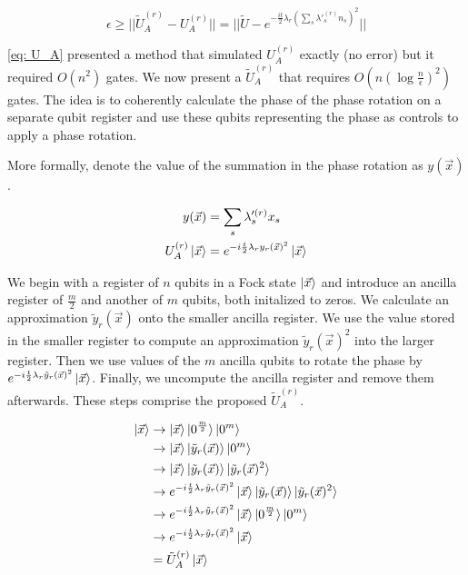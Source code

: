 \begin{equation}
    \epsilon \geq ||\tilde{U}_A^{(r)} - U_A^{(r)}|| = ||\tilde{U} - e^{-\frac{it}{2}\lambda_r\left(\sum_s \lambda'^{(r)}_s n_s\right)^2}|| \label{eq: error}
\end{equation}

\eqref{eq: U_A} presented a method that simulated $U_A^{(r)}$ exactly (no error) but it required $O(n^2)$ gates. We now present a $\tilde{U}_A^{(r)}$ that requires $O(n(\log{\frac{n}{\epsilon}})^2)$ gates. The idea is to coherently calculate the phase of the phase rotation on a separate qubit register and use these qubits representing the phase as controls to apply a phase rotation.

More formally, denote the value of the summation in the phase rotation as $y(\vec{x})$.

\begin{equation}
    \begin{split}
        y(\vec{x}) &= \sum_s \lambda'^{(r)}_s x_s \\
        U_A^{(r)}\ket{\vec{x}} &= e^{-i\frac{t}{2}\lambda_ry_r(\vec{x})^2}\ket{\vec{x}}
    \end{split}
\end{equation}

We begin with a register of $n$ qubits in a Fock state $\ket{\vec{x}}$ and introduce an ancilla register of $\frac{m}{2}$ and another of $m$ qubits, both initalized to zeros. We calculate an approximation $\tilde{y}_r(\vec{x})$ onto the smaller ancilla register. We use the value stored in the smaller register to compute an approximation $\tilde{y}_r(\vec{x})^2$ into the larger register. Then we use values of the $m$ ancilla qubits to rotate the phase by $e^{-i\frac{t}{2}\lambda_r\tilde{y}_r(\vec{x})^2}\ket{\vec{x}}$. Finally, we uncompute the ancilla register and remove them afterwards. These steps comprise the proposed $\tilde{U}_A^{(r)}$.

\begin{align}
    \ket{\vec{x}} &\rightarrow \ket{\vec{x}}\ket{0^{\frac{m}{2}}}\ket{0^m} \\
    &\rightarrow \ket{\vec{x}}\ket{\tilde{y}_r(\vec{x})}\ket{0^m} \label{eq: summation}\\
    &\rightarrow \ket{\vec{x}}\ket{\tilde{y}_r(\vec{x})}\ket{\tilde{y}_r(\vec{x})^2} \label{eq: squaring} \\
    &\rightarrow e^{-i\frac{t}{2}\lambda_r\tilde{y}_r(\vec{x})^2}\ket{\vec{x}}\ket{\tilde{y}_r(\vec{x})}\ket{\tilde{y}_r(\vec{x})^2} \label{eq: phase} \\
    &\rightarrow e^{-i\frac{t}{2}\lambda_r\tilde{y}_r(\vec{x})^2}\ket{\vec{x}}\ket{0^{\frac{m}{2}}}\ket{0^m} \\
    &\rightarrow e^{-i\frac{t}{2}\lambda_r\tilde{y}_r(\vec{x})^2}\ket{\vec{x}} \\
    &= \tilde{U}_A^{(r)}\ket{\vec{x}}
\end{align}

